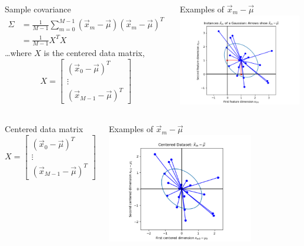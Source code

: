 \documentclass{beamer}
\begin{document}
\begin{frame}
  \begin{columns}
    \column{2.25in}
    \begin{block}{Sample covariance}
      \begin{align*}
        \Sigma&=\frac{1}{M-1}\sum_{m=0}^{M-1}(\vec{x}_m-\vec\mu)(\vec{x}_m-\vec\mu)^T\\
        &=\frac{1}{M-1}X^TX
      \end{align*}
      \ldots where $X$ is the centered data matrix,
      \[
      X=\left[\begin{array}{c}
          (\vec{x}_0-\vec\mu)^T\\\vdots\\(\vec{x}_{M-1}-\vec\mu)^T\end{array}\right]
      \]
    \end{block}
    \column{2.125in}
    \begin{block}{Examples of $\vec{x}_m-\vec\mu$}
      \includegraphics[width=2.1in]{gaussian_subtraction.png}
    \end{block}
  \end{columns}
\end{frame}

\begin{frame}
  \begin{columns}
    \column{1.75in}
    \begin{block}{Centered data matrix}
      \[
      X=\left[\begin{array}{c}
          (\vec{x}_0-\vec\mu)^T\\\vdots\\(\vec{x}_{M-1}-\vec\mu)^T\end{array}\right]
      \]
    \end{block}
    \column{2.625in}
    \begin{block}{Examples of $\vec{x}_m-\vec\mu$}
      \includegraphics[width=2.5in]{centered_data.png}
    \end{block}
  \end{columns}
\end{frame}
\end{document}
